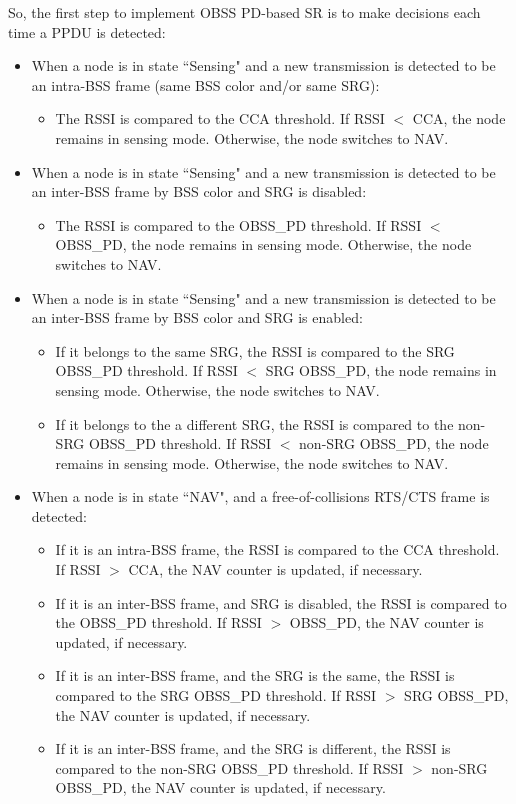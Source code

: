 \documentclass[]{article}
\begin{document}
	So, the first step to implement OBSS PD-based SR is to make decisions each time a PPDU is detected:	
	\begin{itemize}
		\item When a node is in state ``Sensing" and a new transmission is detected to be an intra-BSS frame (same BSS color and/or same SRG): 
		\begin{itemize}
			\item The RSSI is compared to the CCA threshold. If RSSI $<$ CCA, the node remains in sensing mode. Otherwise, the node switches to NAV.
		\end{itemize}
		\item When a node is in state ``Sensing" and a new transmission is detected to be an inter-BSS frame by BSS color and SRG is disabled: 
		\begin{itemize}
			\item The RSSI is compared to the OBSS\_PD threshold. If RSSI $<$ OBSS\_PD, the node remains in sensing mode. Otherwise, the node switches to NAV.
		\end{itemize}
		\item When a node is in state ``Sensing" and a new transmission is detected to be an inter-BSS frame by BSS color and SRG is enabled: 
		\begin{itemize}
			\item If it belongs to the same SRG, the RSSI is compared to the SRG OBSS\_PD threshold. If RSSI $<$ SRG OBSS\_PD, the node remains in sensing mode. Otherwise, the node switches to NAV.
			\item If it belongs to the a different SRG, the RSSI is compared to the non-SRG OBSS\_PD threshold. If RSSI $<$ non-SRG OBSS\_PD, the node remains in sensing mode. Otherwise, the node switches to NAV.
		\end{itemize}
		\item When a node is in state ``NAV", and a free-of-collisions RTS/CTS frame is detected:
		\begin{itemize}
			\item If it is an intra-BSS frame, the RSSI is compared to the CCA threshold. If RSSI $>$ CCA, the NAV counter is updated, if necessary. 
			\item If it is an inter-BSS frame, and SRG is disabled, the RSSI is compared to the OBSS\_PD threshold. If RSSI $>$ OBSS\_PD, the NAV counter is updated, if necessary. 
			\item If it is an inter-BSS frame, and the SRG is the same, the RSSI is compared to the SRG OBSS\_PD threshold. If RSSI $>$ SRG OBSS\_PD, the NAV counter is updated, if necessary. 
			\item If it is an inter-BSS frame, and the SRG is different, the RSSI is compared to the non-SRG OBSS\_PD threshold. If RSSI $>$ non-SRG OBSS\_PD, the NAV counter is updated, if necessary. 
		\end{itemize}
	\end{itemize}
\end{document}
